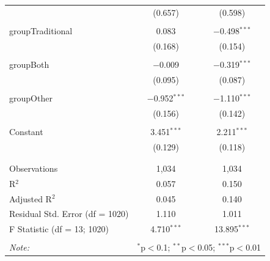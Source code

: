 \documentclass[
]{article}
\begin{document}
\begin{table}[!htbp]
\begin{tabular}{@{\extracolsep{5pt}}lcc}
  & (0.657) & (0.598) \\ 
  & & \\ 
 groupTraditional & 0.083 & $-$0.498$^{***}$ \\ 
  & (0.168) & (0.154) \\ 
  & & \\ 
 groupBoth & $-$0.009 & $-$0.319$^{***}$ \\ 
  & (0.095) & (0.087) \\ 
  & & \\ 
 groupOther & $-$0.952$^{***}$ & $-$1.110$^{***}$ \\ 
  & (0.156) & (0.142) \\ 
  & & \\ 
 Constant & 3.451$^{***}$ & 2.211$^{***}$ \\ 
  & (0.129) & (0.118) \\ 
  & & \\ 
\hline \\[-1.8ex] 
Observations & 1,034 & 1,034 \\ 
R$^{2}$ & 0.057 & 0.150 \\ 
Adjusted R$^{2}$ & 0.045 & 0.140 \\ 
Residual Std. Error (df = 1020) & 1.110 & 1.011 \\ 
F Statistic (df = 13; 1020) & 4.710$^{***}$ & 13.895$^{***}$ \\ 
\hline 
\hline \\[-1.8ex] 
\textit{Note:}  & \multicolumn{2}{r}{$^{*}$p$<$0.1; $^{**}$p$<$0.05; $^{***}$p$<$0.01} \\ 
\end{tabular} 
\end{table} 
\endgroup
\end{document}
